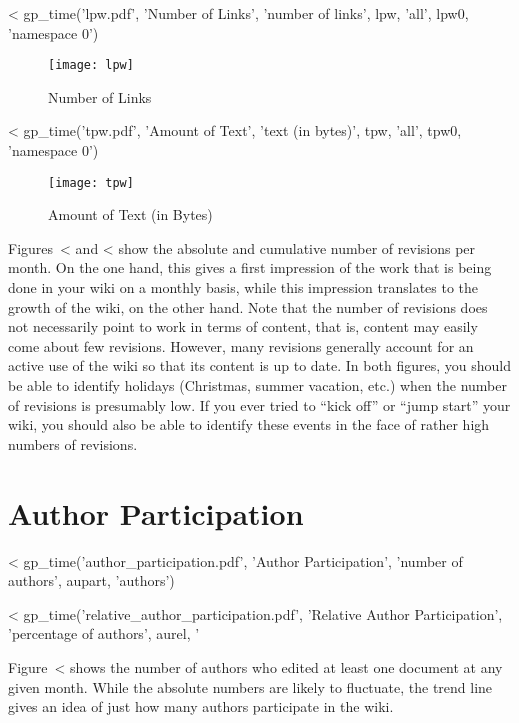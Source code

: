 \documentclass{scrartcl}
\begin{document}
<%
gp_time('lpw.pdf', 'Number of Links', 'number of links', 
        lpw, 'all', lpw0, 'namespace 0')
\begin{figure}
	\centering
	\texttt{[image: lpw]}
	\caption{Number of Links}
	\label{fig:number_of_links}
\end{figure}

<%
gp_time('tpw.pdf', 'Amount of Text', 'text (in bytes)', 
        tpw, 'all', tpw0, 'namespace 0')
\begin{figure}
	\centering
	\texttt{[image: tpw]}
	\caption{Amount of Text (in Bytes)}
	\label{fig:amount_of_text}
\end{figure}

Figures~<%
and 
<%
show the absolute and cumulative number of revisions per month. On the one hand, this gives a first impression of the work that is being done in your wiki on a monthly basis, while this impression translates to the growth of the wiki, on the other hand. Note that the number of revisions does not necessarily point to work in terms of content, that is, content may easily come about few revisions. However, many revisions generally account for an active use of the wiki so that its content is up to date. In both figures, you should be able to identify holidays (Christmas, summer vacation, etc.) when the number of revisions is presumably low. If you ever tried to ``kick off'' or ``jump start'' your wiki, you should also be able to identify these events in the face of rather high numbers of revisions.


\section{Author Participation} %
\label{sec:author_participation}

<%
gp_time('author_participation.pdf', 
        'Author Participation', 'number of authors', 
        aupart, 'authors')

<%
gp_time('relative_author_participation.pdf', 
        'Relative Author Participation', 
        'percentage of authors', 
        aurel, '%

Figure~<%
shows the number of authors who edited at least one document at any given month. While the absolute numbers are likely to fluctuate, the trend line gives an idea of just how many authors participate in the wiki.
\end{document}
